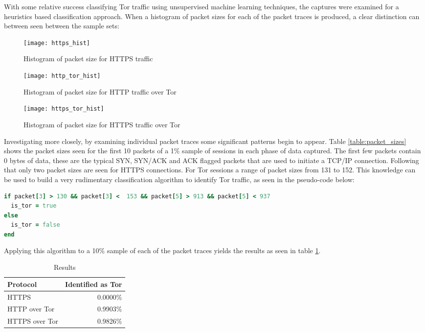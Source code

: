 \documentclass[conference]{IEEEtran}
\begin{document}


With some relative success classifying Tor traffic using unsupervised machine
learning techniques, the captures were examined for a heuristics based
classification approach. When a histogram of packet sizes for each of the
packet traces is produced, a clear distinction can between seen between the
sample sets:

\begin{figure}[H]
  \centering\texttt{[image: https\_hist]}
  \caption{Histogram of packet size for HTTPS traffic}
  \label{https_hist}
\end{figure}

\begin{figure}[H]
  \centering\texttt{[image: http\_tor\_hist]}
  \caption{Histogram of packet size for HTTP traffic over Tor}
  \label{http_tor_hist}
\end{figure}

\begin{figure}[H]
  \centering\texttt{[image: https\_tor\_hist]}
  \caption{Histogram of packet size for HTTPS traffic over Tor}
  \label{https_tor_hist}
\end{figure}

Investigating more closely, by examining individual packet traces some
significant patterns begin to appear. Table \ref{table:packet_sizes} shows the
packet sizes seen for the first 10 packets of a 1\% sample of sessions in each
phase of data captured. The first few packets contain 0 bytes of data, these
are the typical SYN, SYN/ACK and ACK flagged packets that are used to initiate
a TCP/IP connection. Following that only two packet sizes are seen for HTTPS
connections. For Tor sessions a range of packet sizes from 131 to 152. This
knowledge can be used to build a very rudimentary classification algorithm to
identify Tor traffic, as seen in the pseudo-code below:

\begin{lstlisting}[language=ruby]
if packet[3] > 130 && packet[3] <  153 && packet[5] > 913 && packet[5] < 937
  is_tor = true
else
  is_tor = false
end
\end{lstlisting}

Applying this algorithm to a 10\% sample of each of the packet traces yields
the results as seen in table \ref{table:heuristic-results}.

\begin{table}[H]
  \begin{tabular*}{\linewidth}{lr}
    \toprule
    Protocol & Identified as Tor\\
    \midrule
    HTTPS & 0.0000\% \\
    HTTP over Tor & 0.9903\% \\
    HTTPS over Tor & 0.9826\% \\
    \bottomrule
  \end{tabular*}
  \caption{Results}
  \label{table:heuristic-results}
\end{table}
\end{document}
